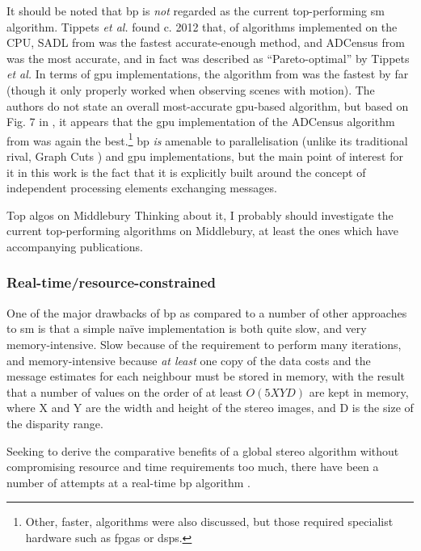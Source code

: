 It should be noted that \gls{bp} is \emph{not} regarded as the current top-performing \gls{sm} algorithm.  Tippets \textit{et al.} found c. 2012 that, of algorithms implemented on the CPU, SADL from \cite{VanDerMark2006} was the fastest accurate-enough method, and ADCensus from \cite{Mei2011} was the most accurate, and in fact was described as ``Pareto-optimal'' by Tippets \textit{et al.}    In terms of \gls{gpu} implementations, the algorithm from \cite{Zhao2011} was the fastest by far (though it only properly worked when observing scenes with motion).  The authors do not state an overall most-accurate \gls{gpu}-based algorithm, but based on Fig. 7 in \cite{Tippetts2016}, it appears that the \gls{gpu} implementation of the ADCensus algorithm from \cite{Mei2011} was again the best.\footnote{Other, faster, algorithms were also discussed, but those required specialist hardware such as \glspl{fpga} or \glspl{dsp}.}  \Gls{bp} \emph{is} amenable to parallelisation (unlike its traditional rival, Graph Cuts \cite{Tappen2003}) and \gls{gpu} implementations, but the main point of interest for it in this work is the fact that it is explicitly built around the concept of independent processing elements exchanging messages.

\begin{anfxwarning}{Top algos on Middlebury}
    Thinking about it, I probably should investigate the current top-performing algorithms on Middlebury, at least the ones which have accompanying publications.
\end{anfxwarning}

\subsubsection{Real-time/resource-constrained }
One of the major drawbacks of \gls{bp} as compared to a number of other approaches to \gls{sm} is that a simple naïve implementation is both quite slow, and very memory-intensive.  Slow because of the requirement to perform many iterations, and memory-intensive because \emph{at least} one copy of the data costs and the message estimates for each neighbour must be stored in memory, with the result that a number of values on the order of at least \(O(5XYD)\) are kept in memory, where X and Y are the width and height of the stereo images, and D is the size of the disparity range.

Seeking to derive the comparative benefits of a global stereo algorithm without compromising resource and time requirements too much, there have been a number of attempts at a real-time \gls{bp} algorithm .

